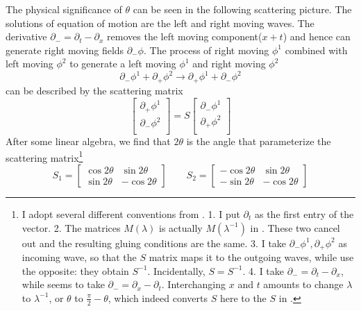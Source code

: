 \documentclass{article}
\begin{document}
The physical significance of $\theta$ can be seen in the following scattering picture. The solutions of equation of motion are the left and right moving waves. The derivative $\partial_{-} = \partial_t - \partial_x$ removes the left moving component($x+t$) and hence can generate right moving fields $\partial_{-} \phi$. The process of right moving $\phi^1$ combined with left moving $\phi^2$ to generate a left moving $\phi^1$ and right moving $\phi^2$
\begin{equation}
\partial_{-} \phi^1 + \partial_{+} \phi^2 \rightarrow \partial_{+} \phi^1 + \partial_{-} \phi^2
\end{equation}
can be described by the scattering matrix
\begin{equation}
\begin{bmatrix}
\partial_{+} \phi^1 \\
\partial_{-} \phi^2 \\
\end{bmatrix}
 = S
\begin{bmatrix}
\partial_{-} \phi^1 \\
\partial_{+} \phi^2 \\
\end{bmatrix}
\end{equation}
After some linear algebra, we find that $2\theta$ is the angle that parameterize the scattering matrix\footnote{I adopt several different conventions from \cite{bachas_permeable_2002}. 1. I put $\partial_t$ as the first entry of the vector. 2. The matrices $M(\lambda)$ is actually $M(\lambda^{-1} )$ in \cite{bachas_permeable_2002}. These two cancel out and the resulting gluing conditions are the same. 3. I take $\partial_{-} \phi^1, \partial_{+} \phi^2$ as incoming wave, so that the $S$ matrix maps it to the outgoing waves, while \cite{bachas_permeable_2002} use the opposite: they obtain $S^{-1}$. Incidentally, $S = S^{-1}$. 4. I take $\partial_{-} = \partial_t - \partial_x $, while \cite{bachas_permeable_2002} seems to take $\partial_{-} = \partial_x - \partial_t$. Interchanging $x$ and $t$ amounts to change $\lambda$ to $\lambda^{-1}$, or $\theta$ to $\frac{\pi}{2}- \theta$, which indeed converts $S$ here to the $S$ in \cite{bachas_permeable_2002}. }
\begin{equation}
\label{eq:S1-S2}
S_1 =
\begin{bmatrix}
\cos 2 \theta & \sin 2 \theta \\
\sin 2 \theta & - \cos 2 \theta     
\end{bmatrix}
\qquad
S_2 = 
\begin{bmatrix}
-\cos 2 \theta & \sin 2 \theta \\
-\sin 2 \theta & - \cos 2 \theta   
\end{bmatrix}
\end{equation}
\end{document}
